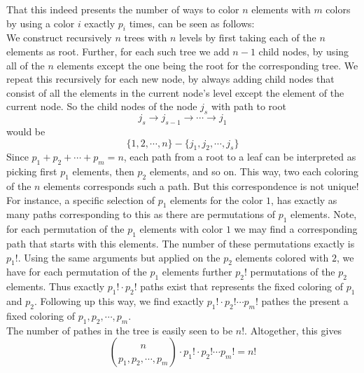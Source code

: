 \documentclass[17pt]{extarticle}
\begin{document}
That this indeed presents the number of ways to color $n$ elements with $m$ colors by using a color
$i$ exactly $p_i$ times, can be seen as follows:\\
We construct recursively $n$ trees with $n$ levels by first taking each of the $n$ elements as root.
Further, for each such tree we add $n-1$ child nodes, by using all of the $n$ elements except the one 
being the root for the corresponding tree. We repeat this recursively for each new node, by always adding
child nodes that consist of all the elements in the current node's level except the element of the current node.
So the child nodes of the node $j_s$ with path to root 
$$j_s \rightarrow  j_{s-1} \rightarrow \cdots \rightarrow j_1$$
would be
$$\{1, 2, \cdots, n \} - \{j_1, j_2, \cdots, j_s\}$$
Since $p_1+p_2+\cdots +p_m=n$, each path from a root to a leaf can be interpreted as picking
first $p_1$ elements, then $p_2$ elements, and so on. This way, two each coloring of the $n$ elements
corresponds such a path. But this correspondence is not unique! For instance, a specific selection of
$p_1$ elements for the color $1$, has exactly as many paths corresponding to this as there are permutations
of $p_1$ elements. Note, for each permutation of the $p_1$ elements with color $1$ we may find a corresponding
path that starts with this elements. The number of these permutations exactly is $p_1!$.
Using the same arguments but applied on the $p_2$ elements colored with $2$,
we have for each permutation of the $p_1$ elements further $p_2!$ permutations of the $p_2$ elements.
Thus exactly $p_1!\cdot p_2!$ paths exist that represents the fixed coloring of $p_1$ and $p_2$.
Following up this way, we find exactly $p_1!\cdot p_2!\cdots p_m!$ pathes the present a fixed coloring of
$p_1, p_2, \cdots, p_m$.\\
The number of pathes in the tree is easily seen to be $n!$. Altogether, this gives
$$
\binom{n}{p_1,p_2, \cdots, p_m}\cdot p_1! \cdot p_2! \cdots p_m! = n!
$$
\end{document}
